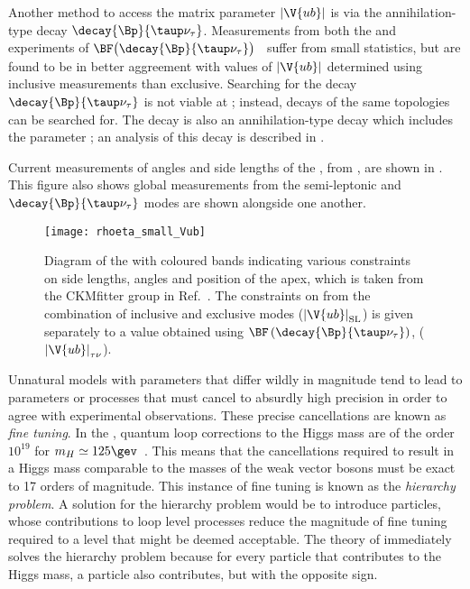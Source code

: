 
Another method to access the \ckm matrix parameter $\left|\V{ub}\right|$ is via the
annihilation-type decay $\decay{\Bp}{\taup\nu_\tau}$.
Measurements from both the \babar and \belle experiments of
$\BF\big(\decay{\Bp}{\taup\nu_\tau}\big)$~\cite{Lees:2012ju,Abdesselam:2014hkd} suffer from small
statistics, but are found to be in better aggreement with values of $\left|\V{ub}\right|$
determined using inclusive measurements than exclusive.
Searching for the decay $\decay{\Bp}{\taup\nu_\tau}$ is not viable at \lhcb; instead, decays of the
same topologies can be searched for.
The decay \btodsphi is also an annihilation-type decay which includes the parameter ; an
analysis of this decay is described in .

Current measurements of angles and side lengths of the \ut, from , are shown
in .
This figure also shows
global  measurements from the semi-leptonic and $\decay{\Bp}{\taup\nu_\tau}$
modes are shown alongside one another.


\begin{figure}
  \begin{center}
      \texttt{[image: rhoeta\_small\_Vub]}
  \end{center}
  \caption[Unitarity triangle and current constraints]
  {
    Diagram of the \ut with coloured bands indicating various constraints on
    side lengths, angles and position of the apex, which is taken from the CKMfitter group in
    Ref.~\protect\cite{Charles:2015gya}.
    The constraints on  from the combination of inclusive and exclusive modes
    ($\left|\V{ub}\right|_\mathrm{SL}$) is given separately to a value obtained using
    $\BF\left(\decay{\Bp}{\taup\nu_\tau}\right)$, ($\left|\V{ub}\right|_{\tau\nu}$).
  }
  \label{fig:th:ckmfitter}
\end{figure}

Unnatural \np models with parameters that differ wildly in magnitude tend to
lead to parameters or processes that must cancel to absurdly
high precision in order to agree with experimental observations.
These precise cancellations are known as \emph{fine tuning}.
In the \sm, quantum loop corrections to the Higgs mass are of the order $10^{19}$
for $m_H\simeq125\gev$~\cite{Chatrchyan:2012ufa,Aad:2012tfa}.
This means that the cancellations required to result in a Higgs mass comparable to the masses of
the weak vector bosons must be exact to 17 orders of magnitude.
This instance of fine tuning is known as the \emph{hierarchy problem}.
A solution for the hierarchy problem would be to introduce \np particles, whose contributions to
loop level processes reduce the magnitude of fine tuning required to a level that might be deemed
acceptable.
The theory of \SUSY immediately solves the hierarchy problem because for every \sm particle that
contributes to the Higgs mass, a \SUSY particle also contributes, but with the opposite sign.

